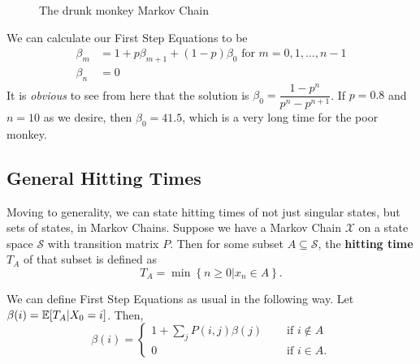 \documentclass[11 pt]{scrartcl}
\begin{document}
\begin{figure}[!ht]
\begin{center}
\end{center}
\caption{The drunk monkey Markov Chain}
\end{figure}

We can calculate our First Step Equations to be 
\begin{align*}
    \beta_m &= 1 + p\beta_{m+1} + (1-p)\beta_0 \text{ for } m = 0, 1, \dots, n-1 \\ 
    \beta_n &= 0 
\end{align*}
It is \emph{obvious} to see from here that the solution is $\beta_0 = \dfrac{1-p^n}{p^n - p^{n+1}}$. If $p = 0.8$ and $n = 10$ as we desire, then $\beta_0 = 41.5$, which is a very long time for the poor monkey. 

\subsection{General Hitting Times}
Moving to generality, we can state hitting times of not just singular states, but sets of states, in Markov Chains. Suppose we have a Markov Chain $\mathcal{X}$ on a state space $\mathcal{S}$ with transition matrix $P$. Then for some subset $A\subseteq \mathcal{S}$, the \textbf{hitting time} $T_A$ of that subset is defined as 
\[ T_A = \min\left\{n\geq 0 | x_n \in A\right\}. \] 

We can define First Step Equations as usual in the following way. Let $\beta(i) = \mathbb E[T_A | X_0 = i]$. Then, 
\[ \beta(i) = \begin{cases} 
        1 + \sum_{j} P(i,j)\beta(j) \quad &\text{ if } i\not\in A \\ 
        0 \quad &\text{ if } i\in A.
    \end{cases} 
\]
\end{document}
